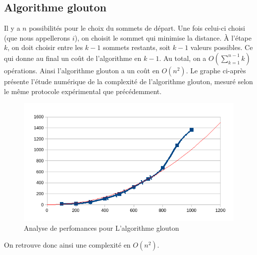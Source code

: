 \documentclass[11pt]{article} \usepackage[top=2cm, bottom=2cm, left=2cm, right=2cm]{geometry}
\begin{document}
\subsection*{Algorithme glouton}
Il y a $n$ possibilités pour le choix du sommets de départ. Une fois celui-ci choisi (que nous appellerons $i$), on choisit le sommet qui minimise la distance. À l'étape $k$, on doit choisir entre les $k-1$ sommets restants, soit $k-1$ valeurs possibles. Ce qui donne au final un coût de l'algorithme en $k-1$. Au total, on a $O(\sum_{k=1}^{n-1} k)$ opérations. 
Ainsi l'algorithme glouton a un coût en $O(n^2)$.
Le graphe ci-après présente l'étude numérique de la complexité de l'algorithme glouton, mesuré selon le même protocole expérimental que précédemment.
  \begin{figure}[ht]
\begin{center}
  
  \includegraphics[scale=0.8]{images/exec_glouton.png}
  \caption{Analyse de perfomances pour L'algorithme glouton}
  \label{fig:glouton}
\end{center}
\end{figure}
On retrouve donc ainsi une complexité en $O(n^2)$.
\end{document}
